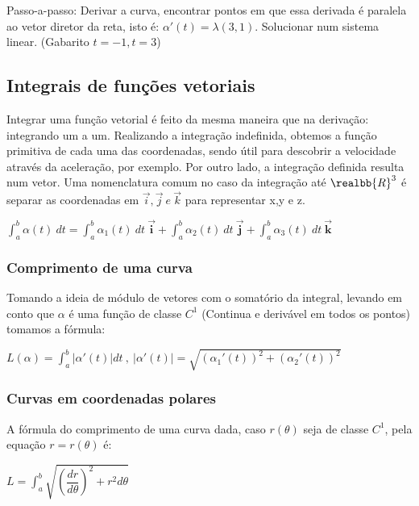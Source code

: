 \documentclass[letterpaper, 11pt]{article}
\begin{document}
Passo-a-passo: Derivar a curva, encontrar pontos em que essa derivada é paralela ao vetor diretor da reta, isto é: \(\alpha'(t) = \lambda(3,1)\). Solucionar num sistema linear. (Gabarito \(t = -1, t = 3\))

\subsection{Integrais de funções vetoriais}
\label{sec:orga5b5c63}
Integrar uma função vetorial é feito da mesma maneira que na derivação: integrando um a um. Realizando a integração indefinida, obtemos a função primitiva de cada uma das coordenadas, sendo útil para descobrir a velocidade através da aceleração, por exemplo.
Por outro lado, a integração definida resulta num vetor. Uma nomenclatura comum no caso da integração até \(\realbb{R}^3\) é separar as coordenadas em \(\vec{i}, \vec{j} \ e \ \vec{k}\) para representar x,y e z.

\begin{center} $\int_{a}^{b} \alpha(t) \ dt = \int_{a}^{b} \alpha_1(t) \ dt \ \vec{\textbf{i}} + \int_{a}^{b} \alpha_2(t) \ dt \ \vec{\textbf{j}} +  \int_{a}^{b} \alpha_3(t) \ dt \ \vec{\textbf{k}}  $ \end{center}

\subsubsection{Comprimento de uma curva}
\label{sec:orge377f53}
Tomando a ideia de módulo de vetores com o somatório da integral, levando em conto que \(\alpha\) é uma função de classe \(C^1\) (Continua e derivável em todos os pontos) tomamos a fórmula:

\begin{center} $L(\alpha) = \int_{a}^{b} |\alpha'(t)| dt \ , \ |\alpha'(t)| = \sqrt{(\alpha_1'(t))^2 + (\alpha_2'(t))^2}$ \end{center}

\subsubsection{Curvas em coordenadas polares}
\label{sec:orgadb780d}
A fórmula do comprimento de uma curva dada, caso \(r(\theta)\) seja de classe \(C^1\), pela equação \(r = r(\theta)\) é:

\begin{center} $L =\int_{a}^{b} \sqrt{(\dfrac{dr}{d\theta})^2 + r^2 d\theta}$ \end{center}
\end{document}
